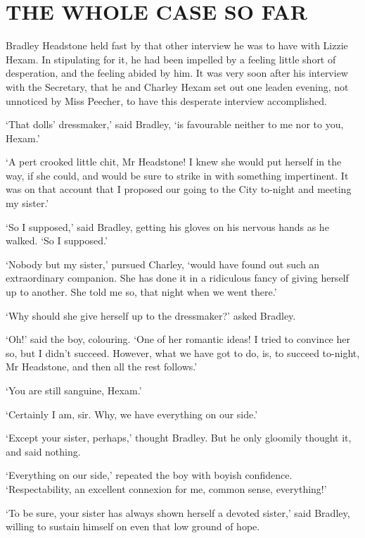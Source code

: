 
\chapter{THE WHOLE CASE SO FAR}

Bradley Headstone held fast by that other interview he was to have with
Lizzie Hexam. In stipulating for it, he had been impelled by a feeling
little short of desperation, and the feeling abided by him. It was very
soon after his interview with the Secretary, that he and Charley Hexam
set out one leaden evening, not unnoticed by Miss Peecher, to have this
desperate interview accomplished.

‘That dolls’ dressmaker,’ said Bradley, ‘is favourable neither to me nor
to you, Hexam.’

‘A pert crooked little chit, Mr Headstone! I knew she would put herself
in the way, if she could, and would be sure to strike in with something
impertinent. It was on that account that I proposed our going to the
City to-night and meeting my sister.’

‘So I supposed,’ said Bradley, getting his gloves on his nervous hands
as he walked. ‘So I supposed.’

‘Nobody but my sister,’ pursued Charley, ‘would have found out such an
extraordinary companion. She has done it in a ridiculous fancy of giving
herself up to another. She told me so, that night when we went there.’

‘Why should she give herself up to the dressmaker?’ asked Bradley.

‘Oh!’ said the boy, colouring. ‘One of her romantic ideas! I tried to
convince her so, but I didn’t succeed. However, what we have got to do,
is, to succeed to-night, Mr Headstone, and then all the rest follows.’

‘You are still sanguine, Hexam.’

‘Certainly I am, sir. Why, we have everything on our side.’

‘Except your sister, perhaps,’ thought Bradley. But he only gloomily
thought it, and said nothing.

‘Everything on our side,’ repeated the boy with boyish confidence.
‘Respectability, an excellent connexion for me, common sense,
everything!’

‘To be sure, your sister has always shown herself a devoted sister,’
said Bradley, willing to sustain himself on even that low ground of
hope.

